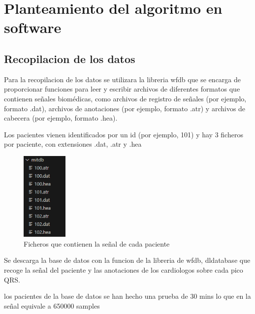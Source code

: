 \chapter{Planteamiento del algoritmo en software}
\section{Recopilacion de los datos}
Para la recopilacion de los datos se utilizara la libreria wfdb que se encarga de proporcionar
funciones para leer y escribir archivos de diferentes formatos que contienen señales biomédicas,
como archivos de registro de señales (por ejemplo, formato .dat), archivos de anotaciones
 (por ejemplo, formato .atr) y archivos de cabecera (por ejemplo, formato .hea).

 Los pacientes vienen identificados por un id (por ejemplo, 101) y hay 3 ficheros por paciente, 
 con extensiones .dat, .atr y .hea

\begin{figure}[h!]
	\centering
	\includegraphics[width=0.2\textwidth]{./Images/img_algoritmo/ficheros_pacientes.png}
	\caption{Ficheros que contienen la señal de cada paciente}
	\label{fig:seniales_pacientes}
\end{figure}

Se descarga la base de datos con la funcion de la libreria de wfdb, dldatabase que recoge 
la señal del paciente y las anotaciones de los cardiologos sobre cada pico QRS.

los pacientes de la base de datos se han hecho una prueba de 30 mins lo que en la señal 
equivale a 650000 samples
